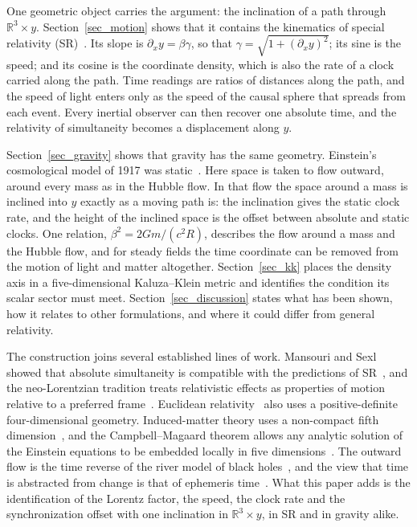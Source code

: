 \documentclass[anonymous]{iopjournal}
\begin{document}
One geometric object carries the argument: the inclination of a path through $\mathbb{R}^3\times y$. Section~\ref{sec_motion} shows that it contains the kinematics of special relativity (SR)~\cite{einstein1905electrodynamics}. Its slope is $\partial_x y=\beta\gamma$, so that $\gamma=\sqrt{1+(\partial_x y)^2}$; its sine is the speed; and its cosine is the coordinate density, which is also the rate of a clock carried along the path. Time readings are ratios of distances along the path, and the speed of light enters only as the speed of the causal sphere that spreads from each event. Every inertial observer can then recover one absolute time, and the relativity of simultaneity becomes a displacement along $y$.

Section~\ref{sec_gravity} shows that gravity has the same geometry. Einstein's cosmological model of 1917 was static~\cite{Einstein1917CosmologicalConsiderations, ORaifeartaigh2017EinsteinCosmology, Nussbaumer2014EinsteinStaticToExpanding}. Here space is taken to flow outward, around every mass as in the Hubble flow. In that flow the space around a mass is inclined into $y$ exactly as a moving path is: the inclination gives the static clock rate, and the height of the inclined space is the offset between absolute and static clocks. One relation, $\beta^2=2Gm/(c^2R)$, describes the flow around a mass and the Hubble flow, and for steady fields the time coordinate can be removed from the motion of light and matter altogether. Section~\ref{sec_kk} places the density axis in a five-dimensional Kaluza--Klein metric and identifies the condition its scalar sector must meet. Section~\ref{sec_discussion} states what has been shown, how it relates to other formulations, and where it could differ from general relativity.

The construction joins several established lines of work. Mansouri and Sexl showed that absolute simultaneity is compatible with the predictions of SR~\cite{MansouriSexl1977}, and the neo-Lorentzian tradition treats relativistic effects as properties of motion relative to a preferred frame~\cite{Bell1976,Brown2005}. Euclidean relativity~\cite{Montanus2001,Almeida2001} also uses a positive-definite four-dimensional geometry. Induced-matter theory uses a non-compact fifth dimension~\cite{Wesson1999STM,OverduinWesson1997}, and the Campbell--Magaard theorem allows any analytic solution of the Einstein equations to be embedded locally in five dimensions~\cite{Campbell1926Course,Magaard1963}. The outward flow is the time reverse of the river model of black holes~\cite{HamiltonLisle2008}, and the view that time is abstracted from change is that of ephemeris time~\cite{Barbour2009}. What this paper adds is the identification of the Lorentz factor, the speed, the clock rate and the synchronization offset with one inclination in $\mathbb{R}^3\times y$, in SR and in gravity alike.
\end{document}

